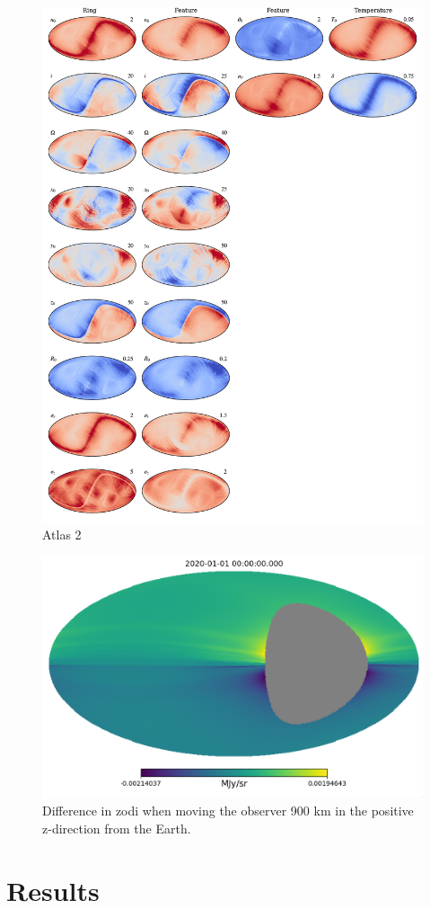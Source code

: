 \documentclass{aa}
\begin{document}
\begin{figure}
    \centering
         \includegraphics[width=0.8\linewidth]{figs/atlas_2_v2.pdf}
        \caption{Atlas 2}
      \label{fig: atlas2}
  \end{figure}

\begin{figure}
    \centering
         \includegraphics[width=0.5\linewidth]{figs/Z+900km.png}
        \caption{Difference in zodi when moving the observer 900 km in the positive z-direction from the Earth.}
      \label{fig: z}
  \end{figure}
  
\section{Results}
\end{document}
